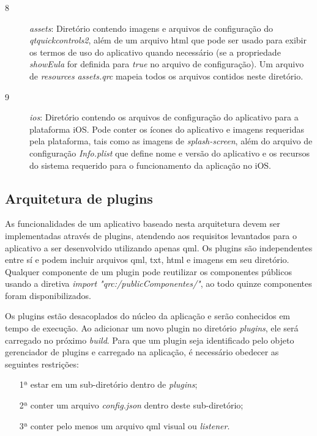 \begin{description}
	\item[8] \textit{assets}: Diretório contendo imagens e arquivos de configuração do \textit{qtquickcontrols2}, além de um arquivo html que pode ser usado para exibir os termos de uso do aplicativo quando necessário (se a propriedade \textit{showEula} for definida para \textit{true} no arquivo de configuração). Um arquivo de \textit{resources} \textit{assets.qrc} mapeia todos os arquivos contidos neste diretório.

	\item[9] \textit{ios}: Diretório contendo os arquivos de configuração do aplicativo para a plataforma iOS. Pode conter os ícones do aplicativo e imagens requeridas pela plataforma, tais como as imagens de \textit{splash-screen}, além do arquivo de configuração \textit{Info.plist} que define nome e versão do aplicativo e os recursos do sistema requerido para o funcionamento da aplicação no iOS.
\end{description}


\subsection{Arquitetura de plugins}
As funcionalidades de um aplicativo baseado nesta arquitetura devem ser implementadas através de plugins, atendendo aos requisitos levantados para o aplicativo a ser desenvolvido utilizando apenas qml. Os plugins são independentes entre sí e podem incluir arquivos qml, txt, html e imagens em seu diretório. Qualquer componente de um plugin pode reutilizar os componentes públicos usando a diretiva \textit{import "qrc:/publicComponentes/"}, ao todo quinze componentes foram disponibilizados.\par
Os plugins estão desacoplados do núcleo da aplicação e serão conhecidos em tempo de execução. Ao adicionar um novo plugin no diretório \textit{plugins}, ele será carregado no próximo \textit{build}. Para que um plugin seja identificado pelo objeto gerenciador de plugins e carregado na aplicação, é necessário obedecer as seguintes restrições:

\begin{enumerate}
	\item[1ª] estar em um sub-diretório dentro de \textit{plugins};
	\item[2ª] conter um arquivo \textit{config.json} dentro deste sub-diretório;
	\item[3ª] conter pelo menos um arquivo qml visual ou \textit{listener}.
\end{enumerate}

